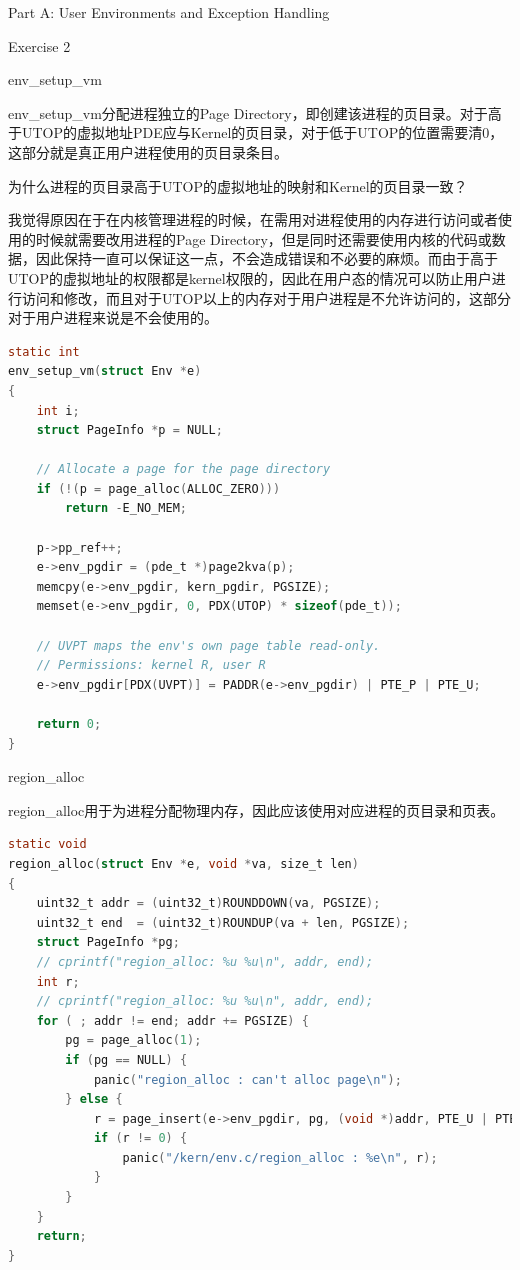 \documentclass[GBK,winfonts,a4paper,10pt]{ctexart}
\begin{document}
\begin{section}{ Part A: User Environments and Exception Handling }
\begin{subsection}{ Exercise 2 }
\begin{subsubsection}{env\_setup\_vm}
\par
env\_setup\_vm分配进程独立的Page Directory，即创建该进程的页目录。对于高于UTOP的虚拟地址PDE应与Kernel的页目录，对于低于UTOP的位置需要清0，这部分就是真正用户进程使用的页目录条目。
\par
为什么进程的页目录高于UTOP的虚拟地址的映射和Kernel的页目录一致？
\par
我觉得原因在于在内核管理进程的时候，在需用对进程使用的内存进行访问或者使用的时候就需要改用进程的Page Directory，但是同时还需要使用内核的代码或数据，因此保持一直可以保证这一点，不会造成错误和不必要的麻烦。而由于高于UTOP的虚拟地址的权限都是kernel权限的，因此在用户态的情况可以防止用户进行访问和修改，而且对于UTOP以上的内存对于用户进程是不允许访问的，这部分对于用户进程来说是不会使用的。
\begin{lstlisting}[language=C]
static int
env_setup_vm(struct Env *e)
{
	int i;
	struct PageInfo *p = NULL;

	// Allocate a page for the page directory
	if (!(p = page_alloc(ALLOC_ZERO)))
		return -E_NO_MEM;

    p->pp_ref++;
    e->env_pgdir = (pde_t *)page2kva(p);
    memcpy(e->env_pgdir, kern_pgdir, PGSIZE);
    memset(e->env_pgdir, 0, PDX(UTOP) * sizeof(pde_t));

	// UVPT maps the env's own page table read-only.
	// Permissions: kernel R, user R
	e->env_pgdir[PDX(UVPT)] = PADDR(e->env_pgdir) | PTE_P | PTE_U;

	return 0;
}
\end{lstlisting}
\end{subsubsection}

\begin{subsubsection}{region\_alloc}
\par
region\_alloc用于为进程分配物理内存，因此应该使用对应进程的页目录和页表。
\begin{lstlisting}[language=C]
static void
region_alloc(struct Env *e, void *va, size_t len)
{
    uint32_t addr = (uint32_t)ROUNDDOWN(va, PGSIZE);
    uint32_t end  = (uint32_t)ROUNDUP(va + len, PGSIZE);
    struct PageInfo *pg;
    // cprintf("region_alloc: %u %u\n", addr, end);
    int r;
    // cprintf("region_alloc: %u %u\n", addr, end);
    for ( ; addr != end; addr += PGSIZE) {
        pg = page_alloc(1);
        if (pg == NULL) {
            panic("region_alloc : can't alloc page\n");
        } else {
            r = page_insert(e->env_pgdir, pg, (void *)addr, PTE_U | PTE_W);
            if (r != 0) {
                panic("/kern/env.c/region_alloc : %e\n", r);
            }
        }
    }
    return;
}
\end{lstlisting}
\end{subsubsection}



\end{subsection}
\end{section}
\end{document}

